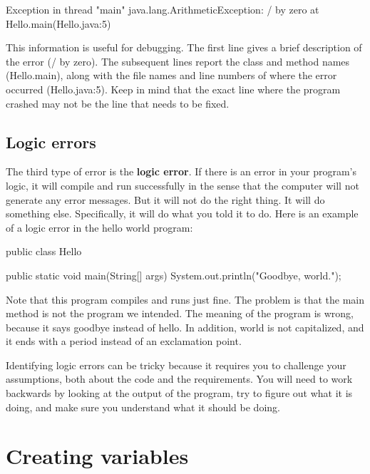 \begin{small}
\begin{stdout}
Exception in thread "main" java.lang.ArithmeticException: / by zero
    at Hello.main(Hello.java:5)
\end{stdout}
\end{small}

This information is useful for debugging.
The first line gives a brief description of the error (/ by zero).
The subsequent lines report the class and method names (Hello.main), along with the file names and line numbers of where the error occurred (Hello.java:5).
Keep in mind that the exact line where the program crashed may not be the line that needs to be fixed.

\subsection{Logic errors}


The third type of error is the {\bf logic error}.
If there is an error in your program's logic, it will compile and run successfully in the sense that the computer will not generate any error messages.
But it will not do the right thing.
It will do something else.
Specifically, it will do what you told it to do.
Here is an example of a logic error in the hello world program:

\begin{code}
public class Hello {

    public static void main(String[] args) {
        System.out.println("Goodbye, world.");
    }

}
\end{code}

Note that this program compiles and runs just fine.
The problem is that the main method is not the program we intended.
The meaning of the program is wrong, because it says goodbye instead of hello.
In addition, world is not capitalized, and it ends with a period instead of an exclamation point.

Identifying logic errors can be tricky because it requires you to challenge your assumptions, both about the code and the requirements.
You will need to work backwards by looking at the output of the program, try to figure out what it is doing, and make sure you understand what it should be doing.


\section{Creating variables}


